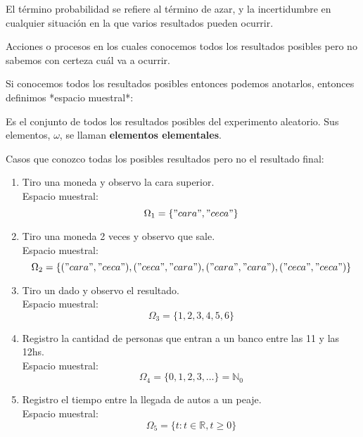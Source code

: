 \documentclass[../main.tex]{subfiles}
\begin{document}
El término probabilidad se refiere al término de azar, y la incertidumbre en cualquier situación en la que varios resultados pueden ocurrir.

\begin{definition}
    Acciones o procesos en los cuales conocemos todos los resultados posibles pero no sabemos con certeza cuál va a ocurrir.
\end{definition}

Si conocemos todos los resultados posibles entonces podemos anotarlos, entonces definimos *espacio muestral*:

\begin{definition}
    Es el conjunto de todos los resultados posibles del experimento aleatorio. Sus elementos, $\omega$, se llaman \textbf{elementos elementales}.
\end{definition}

\begin{defexamples} Casos que conozco todas los posibles resultados pero no el resultado final:
    \begin{enumerate}
        \item Tiro una moneda y observo la cara superior.\\
        Espacio muestral:
        \begin{equation*}
            \Omega_{1} = \{"cara", "ceca"\}
        \end{equation*}
        \item Tiro una moneda 2 veces y observo que sale.\\
        Espacio muestral:
        \begin{equation*}
            \Omega_{2} = \{("cara", "ceca"), ("ceca", "cara"), ("cara", "cara"), ("ceca", "ceca")\}
        \end{equation*}
        \item Tiro un dado y observo el resultado.\\
        Espacio muestral:
        \begin{equation*}
            \Omega_{3} = \{1, 2, 3, 4, 5, 6\}
        \end{equation*}
        \item Registro la cantidad de personas que entran a un banco entre las 11 y las 12hs.\\
        Espacio muestral:
        \begin{equation*}
            \Omega_{4} = \{0, 1, 2, 3, \dots\} = \mathbb{N}_{0}
        \end{equation*}
        \item Registro el tiempo entre la llegada de autos a un peaje.\\
        Espacio muestral:
        \begin{equation*}
            \Omega_{5} = \{t: t \in \mathbb{R}, t \geq 0\}
        \end{equation*}
    \end{enumerate}
\end{defexamples}
\end{document}
